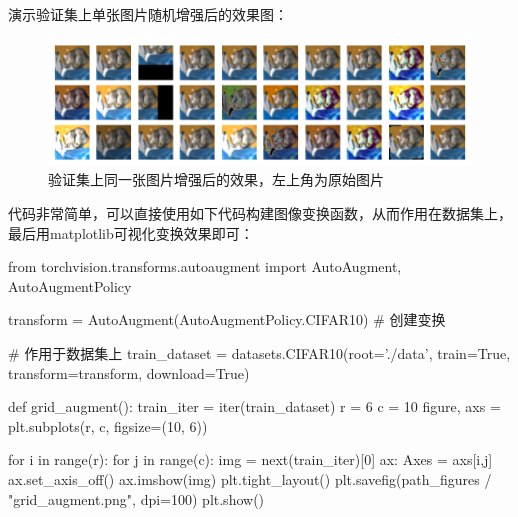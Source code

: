 \documentclass[12pt, a4paper, oneside]{ctexart}
\numberwithin{equation}{section}  %
\begin{document}
演示验证集上单张图片随机增强后的效果图：
\begin{figure}[htbp]
  \centering
  \includegraphics[width=\linewidth]{../code/figures/single_augment.png}
  \caption{验证集上同一张图片增强后的效果，左上角为原始图片}
\end{figure}

代码非常简单，可以直接使用如下代码构建图像变换函数，从而作用在数据集上，最后用matplotlib可视化变换效果即可：
\begin{pythoncode}
from torchvision.transforms.autoaugment import AutoAugment, AutoAugmentPolicy

transform = AutoAugment(AutoAugmentPolicy.CIFAR10)  # 创建变换

# 作用于数据集上
train_dataset = datasets.CIFAR10(root='./data', train=True, transform=transform, download=True)  

def grid_augment():
  train_iter = iter(train_dataset)
  r = 6
  c = 10
  figure, axs = plt.subplots(r, c, figsize=(10, 6))

  for i in range(r):
    for j in range(c):
      img = next(train_iter)[0]
      ax: Axes = axs[i,j]
      ax.set_axis_off()
      ax.imshow(img)
  plt.tight_layout()
  plt.savefig(path_figures / "grid_augment.png", dpi=100)
  plt.show()
\end{pythoncode}
\end{document}

